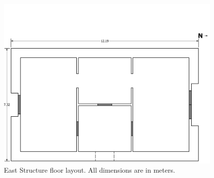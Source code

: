 \documentclass[12pt,oneside]{book}
\begin{document}
\begin{figure}[!ht]
\includegraphics[trim=0cm 0cm 0.25cm 4cm, clip=true, width=6in]{../Drawings/East_Structure_Metric_Simple}
\caption[East Structure Layout]{East Structure floor layout. All dimensions are in meters.}
\label{fig:east_general_plan}
\end{figure}

\clearpage
\end{document}
